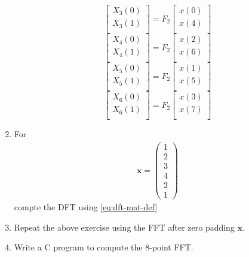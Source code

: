 \documentclass[journal,12pt,twocolumn]{IEEEtran}
\let\vec\mathbf
\numberwithin{equation}{section}
\renewcommand\thesection{\arabic{section}}
\newcommand{\myvec}[1]{\ensuremath{\begin{pmatrix}#1\end{pmatrix}}}
\begin{document}
\begin{enumerate}[label=\arabic*.,ref=\thesection.\theenumi]
\begin{equation}
\begin{bmatrix}
X_{3}(0) \\ 
X_{3}(1)\\ 
\end{bmatrix}
= F_{2}
\begin{bmatrix}
x(0) \\ 
x(4) \\ 
\end{bmatrix}
\end{equation}
\begin{equation}
\begin{bmatrix}
X_{4}(0) \\ 
X_{4}(1)\\ 
\end{bmatrix}
= F_{2}
\begin{bmatrix}
x(2) \\ 
x(6) \\ 
\end{bmatrix}
\end{equation}
\begin{equation}
\begin{bmatrix}
X_{5}(0) \\ 
X_{5}(1)\\ 
\end{bmatrix}
= F_{2}
\begin{bmatrix}
x(1) \\ 
x(5) \\ 
\end{bmatrix}
\end{equation}
\begin{equation}
\begin{bmatrix}
X_{6}(0) \\ 
X_{6}(1)\\ 
\end{bmatrix}
= F_{2}
\begin{bmatrix}
x(3) \\ 
x(7) \\ 
\end{bmatrix}
\end{equation}
\item For 
    \begin{align}
	    \vec{x} = \myvec{1\\2\\3\\4\\2\\1}
        \label{eq:equation1}
    \end{align}
    compte the DFT  
		using 
	    \eqref{eq:dft-mat-def}
    \item Repeat the above exercise using the FFT
	    after zero padding $\vec{x}$.
\item Write a C program to compute the 8-point FFT. 
 \end{enumerate}
\end{document}
